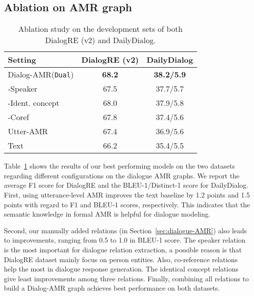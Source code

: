 \documentclass[11pt,a4paper]{article}
\begin{document}
\subsection{Ablation on AMR graph}
\begin{table}
	\centering
	\small
	\begin{tabular}{lcc}
		\toprule
		\textbf{Setting} & DialogRE (v2) & DailyDialog \\
		\midrule
		Dialog-AMR(\texttt{Dual}) & \textbf{68.2} &\textbf{38.2/5.9}  \\
		\quad-Speaker &67.5 &37.7/5.7  \\
		\quad-Ident. concept &68.0 &37.9/5.8 \\
		\quad-Coref &67.8 &37.4/5.6 \\
		Utter-AMR &67.4 &36.9/5.6  \\
		Text &66.2 &35.4/5.5  \\
		\bottomrule
	\end{tabular}
	\caption{Ablation study on the development sets of both DialogRE (v2) and DailyDialog.}
	\label{tab:ablation}
\end{table}
Table~\ref{tab:ablation} shows the results of our best performing models on the two datasets regarding different configurations on the dialogue AMR graphs.
We report the average F1 score for DialogRE and the BLEU-1/Distinct-1 score for DailyDialog.
First, using utterance-level AMR improves the text baseline by 1.2 points and 1.5 points with regard to F1 and BLEU-1 scores, respectively.
This indicates that the semantic knowledge in formal AMR is helpful for dialogue modeling. 

Second, our manually added relations (in Section~\ref{sec:dialogue-AMR}) also leads to improvements, ranging from 0.5 to 1.0 in BLEU-1 score.
The speaker relation is the most important for dialogue relation extraction, a possible reason is that DialogRE dataset mainly focus on person entities. 
Also, co-reference relations help the most in dialogue response generation. 
The identical concept relations give least improvements among three relations. 
Finally, combining all relations to build a Dialog-AMR graph achieves best performance on both datasets. 
\end{document}
